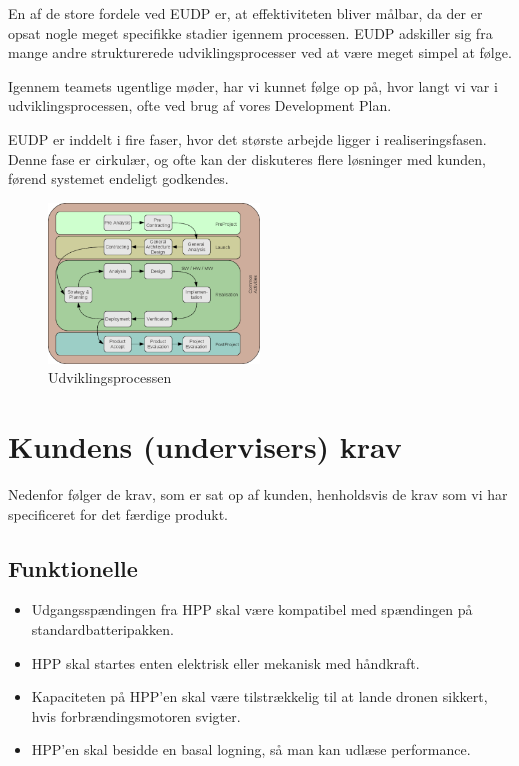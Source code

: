 En af de store fordele ved EUDP er, at effektiviteten bliver målbar, da der er opsat nogle meget specifikke stadier igennem processen. EUDP adskiller sig fra mange andre strukturerede udviklingsprocesser ved at være meget simpel at følge. 

Igennem teamets ugentlige møder, har vi kunnet følge op på, hvor langt vi var i udviklingsprocessen, ofte ved brug af vores Development Plan. 

EUDP er inddelt i fire faser, hvor det største arbejde ligger i realiseringsfasen. Denne fase er cirkulær, og ofte kan der diskuteres flere løsninger med kunden, førend systemet endeligt godkendes. 

\begin{figure}[h]
  \centering
  \includegraphics[width=0.5\textwidth]{./figurer/ij1.png}
  \caption{Udviklingsprocessen}
  \label{fig:ij1}
\end{figure}

\section{Kundens (undervisers) krav}
\label{sec:kravsspecifikation-1}
Nedenfor følger de krav, som er sat op af kunden, henholdsvis de krav som vi har specificeret for det færdige produkt.


\subsection{Funktionelle}
\label{sec:funktionelle}

\begin{itemize}
\item Udgangsspændingen fra HPP skal være kompatibel med spændingen på standardbatteripakken.
\item HPP skal startes enten elektrisk eller mekanisk med håndkraft.
\item Kapaciteten på HPP’en skal være tilstrækkelig til at lande dronen sikkert, hvis forbrændingsmotoren svigter.
\item HPP’en skal besidde en basal logning, så man kan udlæse performance.
\end{itemize}

